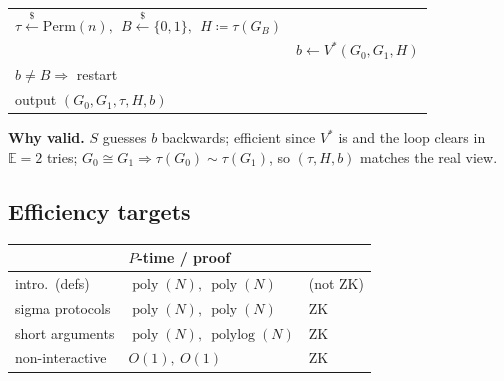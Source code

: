 \documentclass[11pt,a4paper]{article}
\newcommand{\bits}{\{0,1\}}
\newcommand{\Perm}{\mathrm{Perm}}
\newcommand{\samp}{\overset{\$}{\leftarrow}}
\newcommand{\iso}{\cong}
\DeclareMathOperator{\poly}{poly}
\DeclareMathOperator{\polylog}{polylog}
\begin{document}
\begin{protocol}[$S(V^*,G_0,G_1)$]
\begin{tabular}{@{}p{}p{}@{}}
$\tau\samp\Perm(n),\ \ B\samp\bits,\ \ H\coloneqq\tau(G_B)$ & \\
 & \hfill$b\leftarrow V^*(G_0,G_1,H)$\\[2pt]
$b\neq B \Rightarrow$ restart & \\
output $(G_0,G_1,\tau,H,b)$ & \\
\end{tabular}
\end{protocol}

\noindent\textbf{Why valid.}\quad
$S$ guesses $b$ backwards; efficient since $V^*$ is and the loop clears in $\mathbb{E}=2$ tries; $G_0\iso G_1 \Rightarrow \tau(G_0)\sim\tau(G_1)$, so $(\tau,H,b)$ matches the real view.

\subsection*{Efficiency targets}
\begin{center}
\begin{tabular}{@{}lll@{}}
\toprule
& $P$-time / proof & \\
\midrule
intro.\ (defs) & $\poly(N),\ \poly(N)$ & (not ZK)\\
sigma protocols & $\poly(N),\ \poly(N)$ & ZK\\
short arguments & $\poly(N),\ \polylog(N)$ & ZK\\
non-interactive & $O(1),\ O(1)$ & ZK\\
\bottomrule
\end{tabular}
\end{center}
\end{document}
